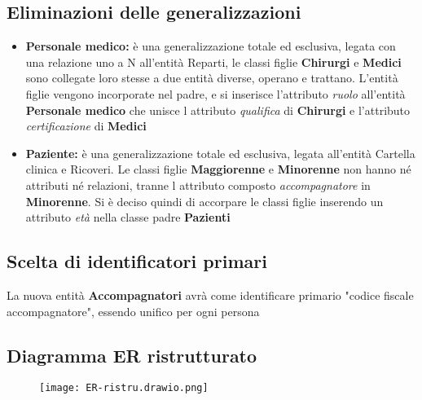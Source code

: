 \documentclass[a4paper, 10pt]{article}
\begin{document}
\subsection{Eliminazioni delle generalizzazioni}
\begin{itemize}
\item \textbf{Personale medico:} è una generalizzazione totale ed esclusiva, legata con una relazione uno a N all'entità Reparti, le classi figlie \textbf{Chirurgi} e \textbf{Medici} sono collegate loro stesse a due entità diverse, operano e trattano. L'entità figlie vengono incorporate nel padre, e si inserisce l'attributo \textit{ruolo} all'entità \textbf{Personale medico} che unisce l attributo \textit{qualifica} di \textbf{Chirurgi} e  l'attributo \textit{certificazione} di \textbf{Medici}
\item \textbf{Paziente:} è una generalizzazione totale ed esclusiva, legata all'entità Cartella clinica e Ricoveri. Le classi figlie \textbf{Maggiorenne} e \textbf{Minorenne} non hanno né attributi né relazioni, tranne l attributo composto \textit{accompagnatore}  in \textbf{Minorenne}. Si è deciso quindi di accorpare le classi figlie inserendo un attributo \textit{età} nella classe padre \textbf{Pazienti}
\end{itemize}
\subsection{Scelta di identificatori primari}
La nuova entità \textbf{Accompagnatori} avrà come identificare primario "codice fiscale accompagnatore", essendo unifico per ogni persona
\subsection{Diagramma ER ristrutturato}
\begin{figure}[H]
    \centering
    \texttt{[image: ER-ristru.drawio.png]}
\end{figure}
\end{document}
